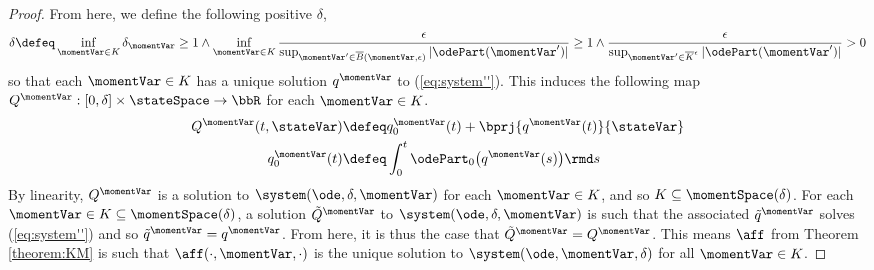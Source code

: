 \begin{proof}
  From here, we define the following positive $\delta$,
  \begin{equation}
    \delta \defeq \inf_{\momentVar \in K} \delta_\momentVar \geq 1 \wedge \inf_{\momentVar\in K} \frac{\epsilon}{\sup_{\momentVar' \in \overline B(\momentVar,\epsilon)} |\odePart(\momentVar')|} \geq 1 \wedge \frac{\epsilon}{\sup_{\momentVar' \in \overline K^\epsilon} |\odePart(\momentVar')|} > 0
  \end{equation}
  so that each $\momentVar \in K$ has a unique solution $q^\momentVar$ to (\ref{eq:system''}).
  This induces the following map $Q^\momentVar: [0,\delta] \times \stateSpace \rightarrow \bbR$ for each $\momentVar \in K$.
  \begin{align}
    Q^\momentVar(t,\stateVar) &\defeq q^\momentVar_0(t) + \bprj{q^\momentVar(t)}{\stateVar} \\
    q_0^\momentVar(t) &\defeq \int_0^t \odePart_0\big(q^\momentVar(s)\big) \rmd s
  \end{align}
  By linearity, $Q^\momentVar$ is a solution to $\system(\ode, \delta, \momentVar)$ for each $\momentVar \in K$, and so $K \subseteq \momentSpace(\delta)$.
  For each $\momentVar \in K \subseteq \momentSpace(\delta)$, a solution $\tilde Q^\momentVar$ to $\system(\ode,\delta,\momentVar)$ is such that the associated $\tilde q^\momentVar$ solves (\ref{eq:system''}) and so $\tilde q^\momentVar = q^\momentVar$.
  From here, it is thus the case that $\tilde Q^\momentVar = Q^\momentVar$.
  This means $\aff$ from Theorem \ref{theorem:KM} is such that $\aff(\cdot,\momentVar,\cdot)$ is the unique solution to $\system(\ode,\momentVar,\delta)$ for all $\momentVar \in K$.
\end{proof}
